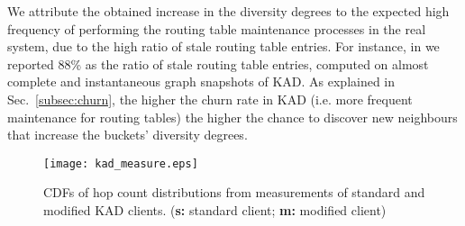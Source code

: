 \documentclass[10pt, conference, compsocconf, letterpaper]{IEEEtran}
\begin{document}
We attribute the obtained increase in the diversity degrees to the expected high frequency of performing the routing table maintenance processes in the real system, due to the high ratio of stale routing table entries. For instance, in \cite{salah14characterizing} we reported 88\% as the ratio of stale routing table entries, computed on almost complete and instantaneous graph snapshots of KAD. As explained in Sec.~\ref{subsec:churn}, the higher the churn rate in KAD (i.e. more frequent maintenance for routing tables) the higher the chance to discover new neighbours that increase the buckets' diversity degrees. 





\begin{figure} \centering
\captionsetup{font=scriptsize}
      \texttt{[image: kad\_measure.eps]} 
   \caption{CDFs of hop count distributions from measurements of standard and modified KAD clients. (\textbf{s:} standard client; \textbf{m:} modified client)}
   \label{fig:all_hop_count_measure_dist}
\end{figure}





\begin{comment}

\subsection{Limitations} 
\label{subsec:limitations}

Our current evaluation tools have two limitations: First, measurements and model predictions cannot be compared to each others since the current model does not support churn. Second, our simulations do not scale for larger than 20,000 nodes, and therefore they cannot be compared to model predictions of relatively large system sizes nor measurements in a real system. 



As a consequence, we cannot \emph{precisely} describe, for instance, why in the results above the modified clients that are connected to a standard system achieved higher performance gain than in the full deployment scenario. From the model description (Sec.~\ref{sec:model}), one would expect the opposite. 

Our \emph{intuition} attributes the relatively high improvement that is achieved by the modified clients in the real KAD system to the impact of system size. Nevertheless, proper evaluations for the system performance under churn both for the complete and partial scenarios are required first to explain this in details. Those evaluations require to extend the current model, which is among our agenda for future work.

\textcolor{red}{talk briefly about effect of churn and system size}
\end{comment}
\end{document}
